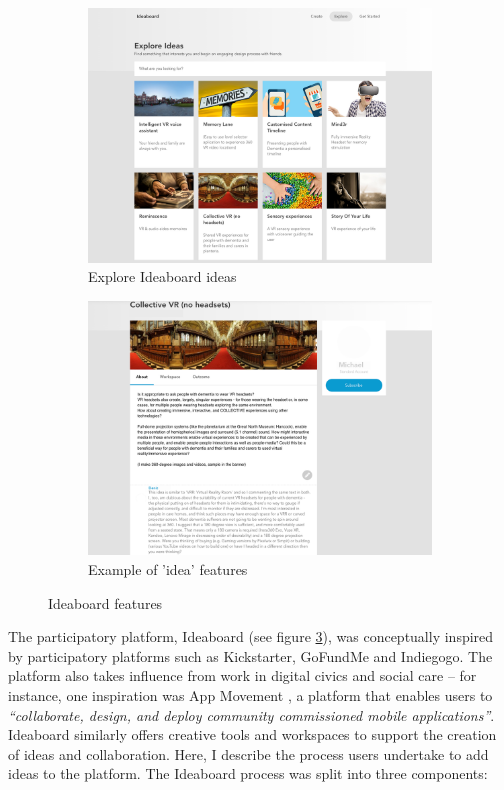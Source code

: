 \begin{figure}[htp]
\centering
\begin{subfigure}{.5\textwidth}
  \centering
  \includegraphics[width=.8\linewidth]{Images/DemVR/Ideaboard Ideas.png}
  \caption{Explore Ideaboard ideas}
  \label{fig:exploreIdeaboard}
\end{subfigure}%
\begin{subfigure}{.5\textwidth}
  \centering
  \includegraphics[width=.8\linewidth]{Images/DemVR/Example of idea.png}
  \caption{Example of 'idea' features}
  \label{fig:IdeaboardIdea}
\end{subfigure}
\caption{Ideaboard features}
\label{fig:IdeaboardFeatures}
\end{figure}

The participatory platform, Ideaboard (see figure \ref{fig:IdeaboardFeatures}), was conceptually inspired by participatory platforms such as Kickstarter, GoFundMe and Indiegogo. The platform also takes influence from work in digital civics and social care – for instance, one inspiration was App Movement \citep{garbett_app_2016}, a platform that enables users to \textit{``collaborate, design, and deploy community commissioned mobile applications''}. Ideaboard similarly offers creative tools and workspaces to support the creation of ideas and collaboration. Here, I describe the process users undertake to add ideas to the platform. The Ideaboard process was split into three components:


